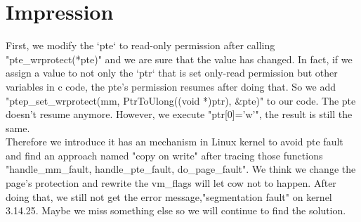 \section{Impression}
    \setlength{\parindent}{25pt}
    First, we modify the `pte` to read-only permission after calling "pte\_wrprotect(*pte)" and we are sure that  the value has changed. 
    In fact, if we assign a value to not only the `ptr` that is set only-read permission but other variables in c code, 
    the pte's permission resumes after doing that. So we add "ptep\_set\_wrprotect(mm, PtrToUlong((void *)ptr), \&pte)" to our code. 
    The pte doesn't resume anymore. However, we execute "ptr[0]='w'", the result is still the same.\\

    Therefore we introduce it has an mechanism in Linux kernel to avoid pte fault and 
    find an approach named "copy on write" after tracing those functions "handle\_mm\_fault, handle\_pte\_fault, do\_page\_fault". 
    We think we change the page's protection and rewrite the vm\_flags will let cow not to happen. 
    After doing that, we still not get the error message,"segmentation fault" on kernel 3.14.25. 
    Maybe we miss something else so we will continue to find the solution.
